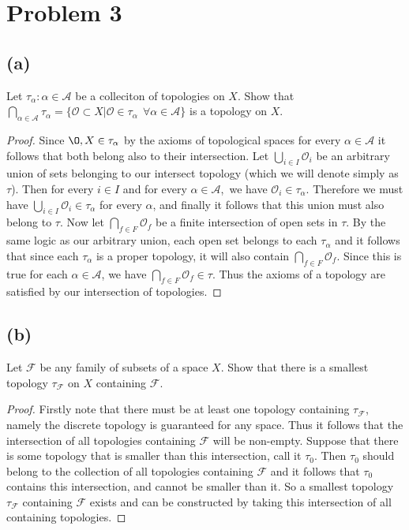 \documentclass{article}
\theoremstyle{definition}
\begin{document}
\section*{Problem 3}
    \subsection*{(a)}
        Let $\tau_\alpha : \alpha \in \mathcal{A}$ be a colleciton of topologies on $X$.
        Show that $\bigcap_{\alpha \in \mathcal{A}}\tau_\alpha = \{\mathcal{O} \subset X | \mathcal O \in \tau_\alpha \ \ \forall \alpha \in \mathcal{A} \}$
        is a topology on $X$.
        \begin{proof}
            Since $\O, X \in \tau_\alpha$ by the axioms of topological spaces for every $\alpha \in \mathcal{A}$ it follows that
            both belong also to their intersection. Let $\bigcup_{i \in I} \mathcal{O}_i$ be an arbitrary union of sets belonging to our
            intersect topology (which we will denote simply as $\tau$). Then for every $i \in I$ and for every $\alpha \in \mathcal{A}$,\
            we have $\mathcal{O}_i \in \tau_\alpha$. Therefore we must have $\bigcup_{i \in I} \mathcal{O}_i \in \tau_\alpha$ for every $\alpha$, 
            and finally it follows that this union must also belong to $\tau$. Now let $\bigcap_{f \in F}\mathcal{O}_f$ be a finite intersection of
            open sets in $\tau$. By the same logic as our arbitrary union, each open set belongs to each $\tau_\alpha$ and it follows that since each $\tau_\alpha$ is a
            proper topology, it will also contain $\bigcap_{f \in F} \mathcal{O}_f$. Since this is true for each $\alpha \in \mathcal{A}$, we have $\bigcap_{f \in F}\mathcal{O}_f \in \tau$.
            Thus the axioms of a topology are satisfied by our intersection of topologies.
        \end{proof}
    \subsection*{(b)}
        Let $\mathcal{F}$ be any family of subsets of a space $X$. Show that there is a smallest topology $\tau_\mathcal{F}$ on $X$ containing $\mathcal{F}$.
        \begin{proof}
            Firstly note that there must be at least one topology containing $\tau_\mathcal{F}$, namely the discrete topology is guaranteed for any space.
            Thus it follows that the intersection of all topologies containing $\mathcal{F}$ will be non-empty.
            Suppose that there is some topology that is smaller than this intersection, call it $\tau_0$.
            Then $\tau_0$ should belong to the collection of all topologies containing $\mathcal{F}$ and it follows that
            $\tau_0$ contains this intersection, and cannot be smaller than it. So a smallest topology $\tau_\mathcal{F}$ containing $\mathcal{F}$ exists
            and can be constructed by taking this intersection of all containing topologies.
        \end{proof}
\end{document}
